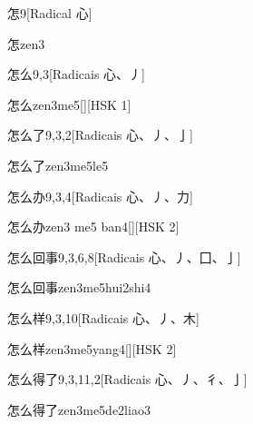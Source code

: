 \begin{entry}{怎}{9}[Radical ⼼]
  \begin{phonetics}{怎}{zen3}
  \end{phonetics}
\end{entry}

\begin{entry}{怎么}{9,3}[Radicais ⼼、⼃]
  \begin{phonetics}{怎么}{zen3me5}[][HSK 1]
  \end{phonetics}
\end{entry}

\begin{entry}{怎么了}{9,3,2}[Radicais ⼼、⼃、⼅]
  \begin{phonetics}{怎么了}{zen3me5le5}
  \end{phonetics}
\end{entry}

\begin{entry}{怎么办}{9,3,4}[Radicais ⼼、⼃、⼒]
  \begin{phonetics}{怎么办}{zen3 me5 ban4}[][HSK 2]
  \end{phonetics}
\end{entry}

\begin{entry}{怎么回事}{9,3,6,8}[Radicais ⼼、⼃、⼞、⼅]
  \begin{phonetics}{怎么回事}{zen3me5hui2shi4}
  \end{phonetics}
\end{entry}

\begin{entry}{怎么样}{9,3,10}[Radicais ⼼、⼃、⽊]
  \begin{phonetics}{怎么样}{zen3me5yang4}[][HSK 2]
  \end{phonetics}
\end{entry}

\begin{entry}{怎么得了}{9,3,11,2}[Radicais ⼼、⼃、⼻、⼅]
  \begin{phonetics}{怎么得了}{zen3me5de2liao3}
  \end{phonetics}
\end{entry}

